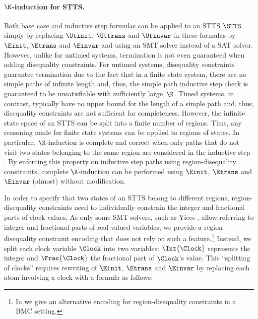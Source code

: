 \paragraph{$\K$-induction for STTS.}
Both base case and inductive step formulas can be applied to an STTS $\STTS$ simply by replacing $\Utinit$, $\Uttrans$ and $\Utinvar$ in these formulas by $\Einit$, $\Etrans$ and $\Einvar$ and using an SMT solver instead of a SAT solver.
However, unlike for untimed systems,
termination is not even guaranteed when adding disequality constraints.
For untimed systems,
disequality constraints guarantee termination due to the fact that
in a finite state system, there are no simple paths of infinite length and, thus, the simple path inductive step check is guaranteed to be unsatisfiable with sufficiently large~$\K$.
Timed systems, in contrast, typically have no upper bound for the length of a simple path and, thus, disequality constraints are not sufficient for completeness.
However, the infinite state space of an STTS can be split into a finite number of regions.
Thus, any reasoning made for finite state systems can be applied to regions of states.
In particular, $\K$-induction is complete and correct
when only paths that do not visit two states belonging to the same region are considered in the inductive step \cite{deMouraEtAl:CAV2003}.
By enforcing this property on inductive step paths using region-disequality
constraints,
complete $\K$-induction can be performed using $\Einit$, $\Etrans$ and $\Einvar$ (almost) without modification.



In order to specify that two states of an STTS belong to different regions,
region-disequality constraints need to individually constrain the integer and
fractional parts of clock values.
As only some SMT-solvers, such as Yices \cite{DBLP:conf/cav/DutertreM06},
allow referring to integer and fractional parts of real-valued variables,
we provide a region-disequality constraint encoding that does not rely on
such a feature.\footnote{In \cite{KindermannJunttilaNiemela:submitted} we give an alternative encoding for region-disequality constraints in a BMC setting.}
Instead, we split each clock variable $\Clock$ into two variables:
$\Int{\Clock}$ represents the integer
and
$\Frac{\Clock}$ the fractional part of $\Clock$'s value.
This ``splitting of clocks'' requires rewriting of
$\Einit$, $\Etrans$ and $\Einvar$ by
replacing each atom involving a clock with
a formula as follows:


